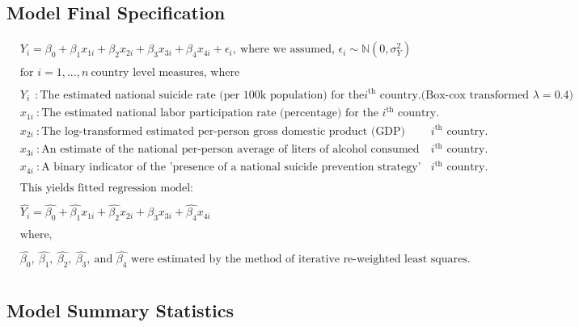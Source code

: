 \documentclass[]{article}
\begin{document}
\subsection{Model Final Specification}\label{model-final-specification}

\[
\begin{aligned}
& Y_i = \beta_0 + \beta_1 x_{1i} + \beta_2 x_{2i} + \beta_3 x_{3i} + \beta_4 x_{4i}  + \epsilon_i,\ \text{where we assumed, } \epsilon_i \sim \mathbb{N}(0,\sigma_{Y}^2) \\
&\\
&\text{for } i = 1,...,n \ \text{country level measures, where} \\
& \\
& Y_i \ \ : \text{The estimated national suicide rate (per 100k population) for the} i^{\text{th}} \text{ country.(Box-cox transformed $\lambda = 0.4$)} \\
& x_{1i}\ : \text{The estimated national labor participation rate (percentage) for the } i^{\text{th}} \text{ country.}\\
& x_{2i}\ : \text{The log-transformed estimated per-person gross domestic product (GDP) (income) for the } i^{\text{th}} \text{ country.}\\
& x_{3i}\ : \text{An estimate of the national per-person average of liters of alcohol consumed annually for the } i^{\text{th}} \text{ country.}\\
& x_{4i}\ : \text{A binary indicator of the 'presence of a national suicide prevention strategy' in 2019 for the } i^{\text{th}} \text{ country.}\\
& \\
& \text{This yields fitted regression model: } \\
& \\
& \hat{Y_i} = \hat{\beta_0} + \hat{\beta_1} x_{1i} + \hat{\beta_2} x_{2i} + \hat{\beta_3} x_{3i} + \hat{\beta_4} x_{4i} \\
& \\
& \text{where, } \\
& \\
& \hat{\beta_0},\ \hat{\beta_1},\ \hat{\beta_2},\ \hat{\beta_3}, \ \text{and } \hat{\beta_4} \text{ were estimated by the method of iterative re-weighted least squares.} \\
\end{aligned}
\]

\subsection{Model Summary Statistics}\label{model-summary-statistics}
\end{document}
